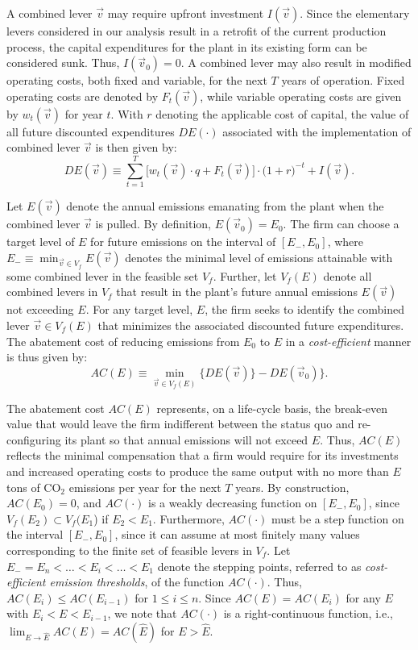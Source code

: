 \documentclass[12pt, a4paper]{article} %
\begin{document}
A combined lever $\vec{v}$ may require upfront investment $I(\vec{v})$. Since the elementary levers considered in our analysis result in a retrofit of the current production process, the capital expenditures for the plant in its existing form can be considered sunk. Thus, $I(\vec{v}_0) = 0$. A combined lever may also result in modified operating costs, both fixed and variable, for the next $T$ years of operation. Fixed operating costs are denoted by $F_t(\vec{v})$, while variable operating costs are given by $w_t(\vec{v})$ for year $t$. With $r$ denoting the applicable cost of capital, the value of all future discounted expenditures $DE(\cdot)$ associated with the implementation of combined lever $\vec{v}$ is then given by:
\begin{equation}
DE(\vec{v}) \equiv \sum_{t=1}^{T} \bigl[w_t(\vec{v}) \cdot q + F_t(\vec{v})\bigr] \cdot \bigl(1+r\bigr)^{-t} + I(\vec{v}).
\end{equation}

Let $E(\vec{v})$ denote the annual emissions emanating from the plant when the combined lever $\vec{v}$ is pulled. By definition, $E(\vec{v}_0) = E_0$. The firm can choose a target level of $E$ for future emissions on the interval of $[E_-, E_0]$, where $E_- \equiv \min_{\vec{v} \in V_f}{E(\vec{v})}$ denotes the minimal level of emissions attainable with some combined lever in the feasible set $V_f$. Further, let $V_f(E)$ denote all combined levers in $V_f$ that result in the plant's future annual emissions $E(\vec{v})$ not exceeding $E$. For any target level, $E$, the firm seeks to identify the combined lever $\vec{v} \in V_f(E)$ that minimizes the associated discounted future expenditures. The abatement cost of reducing emissions from $E_0$ to $E$ in a \emph{cost-efficient} manner is thus given by:
\begin{equation}
AC(E) \equiv \min_{\vec{v} \in V_f(E)}{\{DE(\vec{v})\}- DE(\vec{v}_0)\}}.
\end{equation}

The abatement cost $AC(E)$ represents, on a life-cycle basis, the break-even value that would leave the firm indifferent between the status quo and re-configuring its plant so that annual emissions will not exceed $E$. Thus, $AC(E)$ reflects the minimal compensation that a firm would require for its investments and increased operating costs to produce the same output with no more than $E$ tons of CO$_2$ emissions per year for the next $T$ years. By construction, $AC(E_0)=0$, and $AC(\cdot)$ is a weakly decreasing function on $[E_-, E_0]$, since $V_f(E_2) \subset V_f(E_1$) if $E_2 < E_1$. Furthermore, $AC(\cdot)$ must be a step function on the interval $[E_-, E_0]$, since it can assume at most finitely many values corresponding to the finite set of feasible levers in $V_f$. Let $E_-= E_n < \ldots < E_i < \ldots < E_1$ denote the stepping points, referred to as \emph{cost-efficient emission thresholds}, of the function $AC(\cdot)$. Thus, $AC(E_i) \leq AC(E_{i-1})$ for $1\leq i \leq n$. Since $AC(E) = AC(E_i)$ for any $E$ with $E_{i} < E < E_{i-1}$, we note that $AC(\cdot)$ is a right-continuous function, i.e.,  $\lim_{E \to \hat{E}} AC(E) = AC(\hat{E})$ for $E > \hat{E}$.
\end{document}

